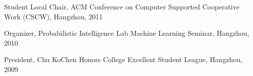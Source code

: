 \documentclass[margin,line]{res}
\newenvironment{list2}{
  \begin{list}{$\bullet$}{%
      \setlength{\itemsep}{0in}
      \setlength{\parsep}{0in} \setlength{\parskip}{0in}
      \setlength{\topsep}{0in} \setlength{\partopsep}{0in} 
      \setlength{\leftmargin}{0.2in}}}{\end{list}}
\begin{document}
\begin{resume}
Student Local Chair, ACM Conference on Computer Supported Cooperative Work (CSCW), Hangzhou, 2011

Organizer, Probabilistic Intelligence Lab Machine Learning Seminar, Hangzhou, 2010

President, Chu KoChen Honors College Excellent Student League, Hangzhou, 2009


%
%
%
%



\end{resume}
\end{document}
